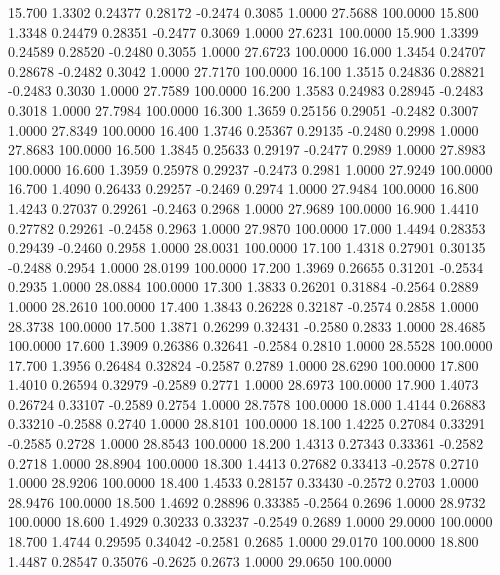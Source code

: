   15.700   1.3302   0.24377   0.28172  -0.2474   0.3085   1.0000  27.5688 100.0000
  15.800   1.3348   0.24479   0.28351  -0.2477   0.3069   1.0000  27.6231 100.0000
  15.900   1.3399   0.24589   0.28520  -0.2480   0.3055   1.0000  27.6723 100.0000
  16.000   1.3454   0.24707   0.28678  -0.2482   0.3042   1.0000  27.7170 100.0000
  16.100   1.3515   0.24836   0.28821  -0.2483   0.3030   1.0000  27.7589 100.0000
  16.200   1.3583   0.24983   0.28945  -0.2483   0.3018   1.0000  27.7984 100.0000
  16.300   1.3659   0.25156   0.29051  -0.2482   0.3007   1.0000  27.8349 100.0000
  16.400   1.3746   0.25367   0.29135  -0.2480   0.2998   1.0000  27.8683 100.0000
  16.500   1.3845   0.25633   0.29197  -0.2477   0.2989   1.0000  27.8983 100.0000
  16.600   1.3959   0.25978   0.29237  -0.2473   0.2981   1.0000  27.9249 100.0000
  16.700   1.4090   0.26433   0.29257  -0.2469   0.2974   1.0000  27.9484 100.0000
  16.800   1.4243   0.27037   0.29261  -0.2463   0.2968   1.0000  27.9689 100.0000
  16.900   1.4410   0.27782   0.29261  -0.2458   0.2963   1.0000  27.9870 100.0000
  17.000   1.4494   0.28353   0.29439  -0.2460   0.2958   1.0000  28.0031 100.0000
  17.100   1.4318   0.27901   0.30135  -0.2488   0.2954   1.0000  28.0199 100.0000
  17.200   1.3969   0.26655   0.31201  -0.2534   0.2935   1.0000  28.0884 100.0000
  17.300   1.3833   0.26201   0.31884  -0.2564   0.2889   1.0000  28.2610 100.0000
  17.400   1.3843   0.26228   0.32187  -0.2574   0.2858   1.0000  28.3738 100.0000
  17.500   1.3871   0.26299   0.32431  -0.2580   0.2833   1.0000  28.4685 100.0000
  17.600   1.3909   0.26386   0.32641  -0.2584   0.2810   1.0000  28.5528 100.0000
  17.700   1.3956   0.26484   0.32824  -0.2587   0.2789   1.0000  28.6290 100.0000
  17.800   1.4010   0.26594   0.32979  -0.2589   0.2771   1.0000  28.6973 100.0000
  17.900   1.4073   0.26724   0.33107  -0.2589   0.2754   1.0000  28.7578 100.0000
  18.000   1.4144   0.26883   0.33210  -0.2588   0.2740   1.0000  28.8101 100.0000
  18.100   1.4225   0.27084   0.33291  -0.2585   0.2728   1.0000  28.8543 100.0000
  18.200   1.4313   0.27343   0.33361  -0.2582   0.2718   1.0000  28.8904 100.0000
  18.300   1.4413   0.27682   0.33413  -0.2578   0.2710   1.0000  28.9206 100.0000
  18.400   1.4533   0.28157   0.33430  -0.2572   0.2703   1.0000  28.9476 100.0000
  18.500   1.4692   0.28896   0.33385  -0.2564   0.2696   1.0000  28.9732 100.0000
  18.600   1.4929   0.30233   0.33237  -0.2549   0.2689   1.0000  29.0000 100.0000
  18.700   1.4744   0.29595   0.34042  -0.2581   0.2685   1.0000  29.0170 100.0000
  18.800   1.4487   0.28547   0.35076  -0.2625   0.2673   1.0000  29.0650 100.0000
